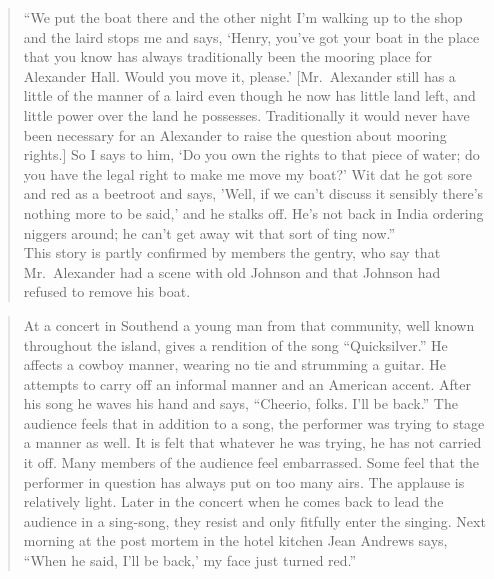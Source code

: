 \documentclass[twoside,symmetric,nobib,justified]{tufte-book}
\begin{document}
\begin{quote}
``We put the boat there and the other night I'm walking up to the shop
and the laird stops me and says, `Henry, you've got your boat in the
place that you know has always traditionally been the mooring place for
Alexander Hall. Would you move it, please.' {[}Mr.~Alexander still has a
little of the manner of a laird even though he now has little land left,
and little power over the land he possesses. Traditionally it would
never have been necessary for an Alexander to raise the question about
mooring rights.{]} So I says to him, `Do you own the rights to that
piece of water; do you have the legal right to make me move my boat?'
Wit dat he got sore and red as a beetroot and says, 'Well, if we can't
discuss it sensibly there's nothing more to be said,' and he stalks off.
He's not back in India ordering niggers around; he can't get away wit
that sort of ting now.''\\
This story is partly confirmed by members the gentry, who say that
Mr.~Alexander had a scene with old Johnson and that Johnson had refused
to remove his boat.
\end{quote}

\begin{quote}
At a concert in Southend a young man from that community, well known
throughout the island, gives a rendition of the song ``Quicksilver.'' He
affects a cowboy manner, wearing no tie and strumming a guitar. He
attempts to carry off an informal manner and an American accent. After
his song he waves his hand and says, ``Cheerio, folks. I'll be back.''
The audience feels that in addition to a song, the performer was trying
to stage a manner as well. It is felt that whatever he was trying, he
has not carried it off. Many members of the audience feel embarrassed.
Some feel that the performer in question has always put on too many
airs. The applause is relatively light. Later in the concert when he
comes back to lead the audience in a sing-song, they resist and only
fitfully enter the singing. Next morning at the post mortem in the hotel
kitchen Jean Andrews says, ``When he said, I'll be back,' my face just
turned red.''
\end{quote}
\end{document}
